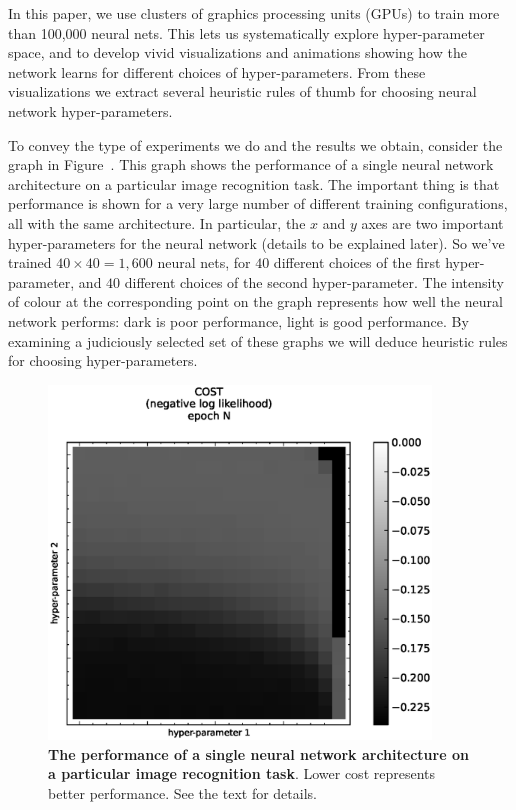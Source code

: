 \documentclass[10pt]{article}
\begin{document}
%
%
In this paper, we use clusters of graphics processing units (GPUs) to
train more than 100,000 neural nets.  This lets us systematically
explore hyper-parameter space, and to develop vivid visualizations and
animations showing how the network learns for different choices of
hyper-parameters.  From these visualizations we extract several
heuristic rules of thumb for choosing neural network hyper-parameters.

%
%
To convey the type of experiments we do and the results we obtain,
consider the graph in Figure~\label{fig:example}.  This graph shows
the performance of a single neural network architecture on a
particular image recognition task.  The important thing is that
performance is shown for a very large number of different training
configurations, all with the same architecture.  In particular, the
$x$ and $y$ axes are two important hyper-parameters for the neural
network (details to be explained later).  So we've trained $40 \times
40 = 1,600$ neural nets, for $40$ different choices of the first
hyper-parameter, and $40$ different choices of the second
hyper-parameter.  The intensity of colour at the corresponding point
on the graph represents how well the neural network performs: dark is
poor performance, light is good performance.  By examining a
judiciously selected set of these graphs we will deduce heuristic
rules for choosing hyper-parameters.

%
\begin{figure}[!ht]
\begin{center}
\includegraphics[width=4in]{plots/example.eps}
\end{center}
\caption{ {\bf The performance of a single neural network architecture
    on a particular image recognition task}.  Lower cost represents
  better performance.  See the text for details.}
\label{fig:example}
\end{figure}
\end{document}

